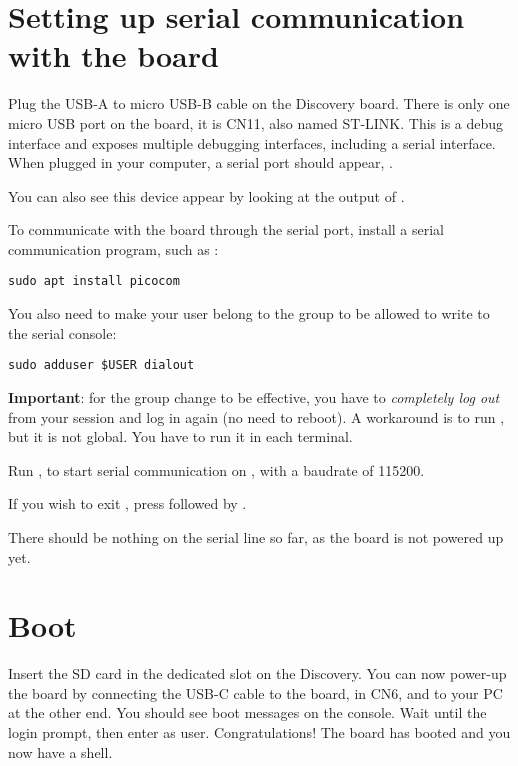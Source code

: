 \section{Setting up serial communication with the board}

Plug the USB-A to micro USB-B cable on the Discovery board. There is
only one micro USB port on the board, it is CN11, also named ST-LINK.
This is a debug interface and exposes multiple debugging interfaces,
including a serial interface. When plugged in your computer, a serial
port should appear, .

You can also see this device appear by looking at the output of
.

To communicate with the board through the serial port, install a
serial communication program, such as :

\begin{verbatim}
sudo apt install picocom
\end{verbatim}

You also need to make your user belong to the  group to be
allowed to write to the serial console:

\begin{verbatim}
sudo adduser $USER dialout
\end{verbatim}

{\bf Important}: for the group change to be effective, you have to
{\em completely log out} from your session and log in again (no need to
reboot). A workaround is to run , but it is not global.
You have to run it in each terminal.

Run , to start serial
communication on , with a baudrate of 115200.

If you wish to exit , press \code{[Ctrl][a]} followed by
\code{[Ctrl][x]}.

There should be nothing on the serial line so far, as the board is not
powered up yet.

\section{Boot}

Insert the SD card in the dedicated slot on the Discovery.  You can
now power-up the board by connecting the USB-C cable to the board, in
CN6,  and to your PC at the other end.  You should see
boot messages on the console. Wait until the login prompt, then enter
 as user.  Congratulations! The board has booted and you
now have a shell.
